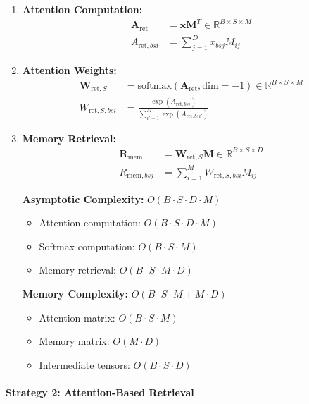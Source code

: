\documentclass{article}
\begin{document}
\begin{enumerate}
\item \textbf{Attention Computation:}
\begin{align}
\mathbf{A}_{\text{ret}} &= \mathbf{x} \mathbf{M}^T \in \mathbb{R}^{B \times S \times M} \\
A_{\text{ret},bsi} &= \sum_{j=1}^{D} x_{bsj} M_{ij}
\end{align}

\item \textbf{Attention Weights:}
\begin{align}
\mathbf{W}_{\text{ret},S} &= \text{softmax}(\mathbf{A}_{\text{ret}}, \text{dim}=-1) \in \mathbb{R}^{B \times S \times M} \\
W_{\text{ret},S,bsi} &= \frac{\exp(A_{\text{ret},bsi})}{\sum_{i'=1}^{M} \exp(A_{\text{ret},bsi'})}
\end{align}

\item \textbf{Memory Retrieval:}
\begin{align}
\mathbf{R}_{\text{mem}} &= \mathbf{W}_{\text{ret},S} \mathbf{M} \in \mathbb{R}^{B \times S \times D} \\
R_{\text{mem},bsj} &= \sum_{i=1}^{M} W_{\text{ret},S,bsi} M_{ij}
\end{align}

\textbf{Asymptotic Complexity:} $O(B \cdot S \cdot D \cdot M)$
\begin{itemize}
\item Attention computation: $O(B \cdot S \cdot D \cdot M)$
\item Softmax computation: $O(B \cdot S \cdot M)$
\item Memory retrieval: $O(B \cdot S \cdot M \cdot D)$
\end{itemize}

\textbf{Memory Complexity:} $O(B \cdot S \cdot M + M \cdot D)$
\begin{itemize}
\item Attention matrix: $O(B \cdot S \cdot M)$
\item Memory matrix: $O(M \cdot D)$
\item Intermediate tensors: $O(B \cdot S \cdot D)$
\end{itemize}
\end{enumerate}

\paragraph{Strategy 2: Attention-Based Retrieval}
\end{document}
